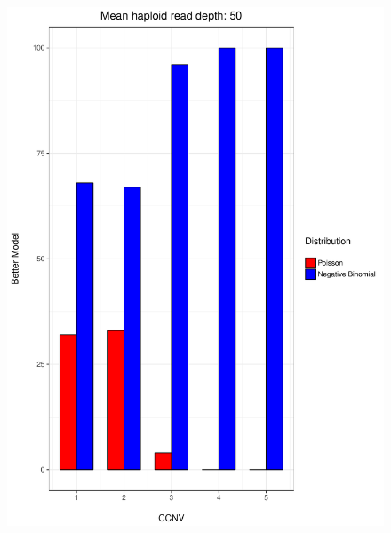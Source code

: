 \documentclass[11pt]{article}
\begin{document}
\begin{figure}
\begin{center}
\includegraphics[scale=0.28]{../Results/Second_Analysis/Better_model_bar50.pdf}

\end{center}
\end{figure}
\end{document}
